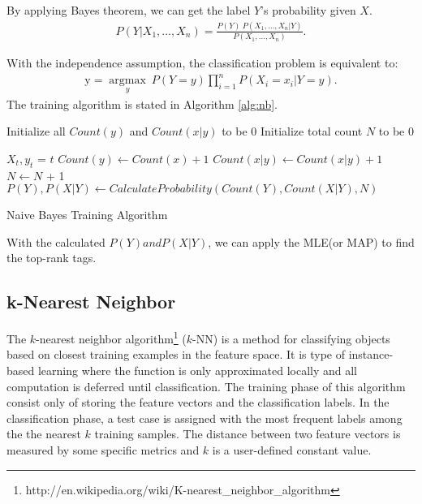 By applying Bayes theorem, we can get the label $Y$'s probability given $X$.
\begin{gather}
    P(Y \vert X_1,\dots,X_n) = \frac{P(Y) \ P(X_1,\dots,X_n\vert Y)}{P(X_1,\dots,X_n)}. 
\end{gather}

With the independence assumption, the classification problem is equivalent to:
\begin{gather}
    \mathrm{y} = \underset{y}{\operatorname{argmax}} \ P(Y=y) \displaystyle\prod_{i=1}^n P(X_i=x_i\vert Y=y).
\end{gather}
The training algorithm is stated in Algorithm \ref{alg:nb}.

\IncMargin{1em}
\begin{algorithm}
\label{alg:nb}
\BlankLine
Initialize all $Count(y)$ and $Count(x|y)$ to be 0\;
Initialize total count $N$ to be 0\;

 {
    $X_t, y_t$ = $t$\;
     {
        $Count(y) \leftarrow Count(x) + 1$ \;
        $Count(x|y) \leftarrow Count(x|y) + 1$ \;
        $N \leftarrow N$ + 1 \;
    }
}
\Return $P(Y), P(X|Y) \leftarrow CalculateProbability(Count(Y), Count(X|Y), N)$

\caption{Naive Bayes Training Algorithm}\label{algo_disjdecomp}
\end{algorithm}
\DecMargin{1em}

With the calculated $P(Y) and P(X|Y)$, we can apply the MLE(or MAP) to find the top-rank tags.

\subsection{k-Nearest Neighbor}

The $k$-nearest neighbor algorithm\footnote{http://en.wikipedia.org/wiki/K-nearest\_neighbor\_algorithm} ($k$-NN) is a method for classifying objects based on closest training examples in the feature space. It is type of instance-based learning where the function is only approximated locally and all computation is deferred until classification. The training phase of this algorithm consist only of storing the feature vectors and the classification labels. In the classification phase, a test case is assigned with the most frequent labels among the the nearest $k$ training samples. The distance between two feature vectors is measured by some specific metrics and $k$ is a user-defined constant value.

